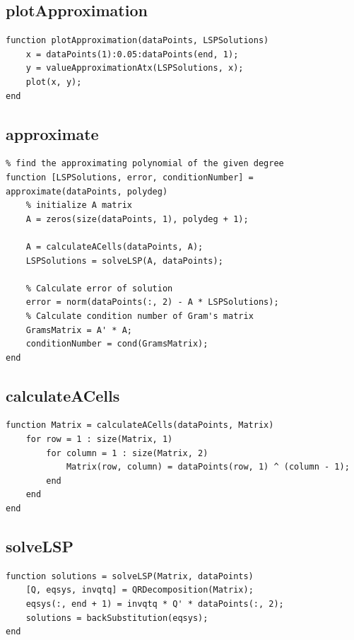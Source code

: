 \subsection{plotApproximation}
\begin{simplechar}
\begin{lstlisting}
function plotApproximation(dataPoints, LSPSolutions)
    x = dataPoints(1):0.05:dataPoints(end, 1);
    y = valueApproximationAtx(LSPSolutions, x);
    plot(x, y);
end

\end{lstlisting}
\end{simplechar}

\subsection{approximate}
\begin{simplechar}
\begin{lstlisting}
% find the approximating polynomial of the given degree
function [LSPSolutions, error, conditionNumber] = approximate(dataPoints, polydeg)
    % initialize A matrix
    A = zeros(size(dataPoints, 1), polydeg + 1);

    A = calculateACells(dataPoints, A);
    LSPSolutions = solveLSP(A, dataPoints);

    % Calculate error of solution
    error = norm(dataPoints(:, 2) - A * LSPSolutions);
    % Calculate condition number of Gram's matrix
    GramsMatrix = A' * A;
    conditionNumber = cond(GramsMatrix);
end
\end{lstlisting}
\end{simplechar}

\subsection{calculateACells}
\begin{simplechar}
\begin{lstlisting}
function Matrix = calculateACells(dataPoints, Matrix)
    for row = 1 : size(Matrix, 1)
        for column = 1 : size(Matrix, 2)
            Matrix(row, column) = dataPoints(row, 1) ^ (column - 1);
        end
    end
end
\end{lstlisting}
\end{simplechar}

\subsection{solveLSP}
\begin{simplechar}
\begin{lstlisting}
function solutions = solveLSP(Matrix, dataPoints)
    [Q, eqsys, invqtq] = QRDecomposition(Matrix);
    eqsys(:, end + 1) = invqtq * Q' * dataPoints(:, 2);
    solutions = backSubstitution(eqsys);
end
\end{lstlisting}
\end{simplechar}

